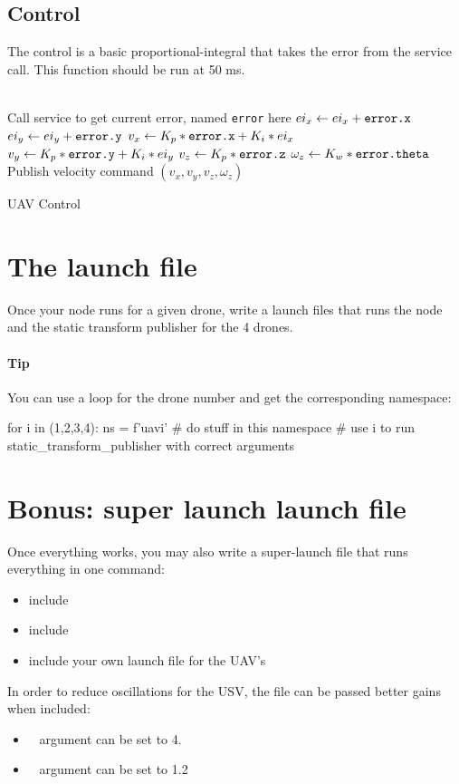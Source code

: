 \documentclass{ecnreport}
\begin{document}
\subsection{Control}

\newcommand{\var}[1]{\texttt{\upshape #1}}

The control is a basic proportional-integral that takes the error from the service call.
This function should be run at 50 ms.

 \begin{algorithm}[!h]
 \DontPrintSemicolon
 \;
 \Fill{}
 {
 \\
 Call service to get current error, named \var{error} here\;
 $ei_x \gets ei_x + \var{error.x}$ \;
 $ei_y \gets ei_y + \var{error.y}$ \;
 $v_x \gets K_p*\var{error.x} + K_i*ei_x$ \;
 $v_y \gets K_p*\var{error.y} + K_i*ei_y$ \;
 $v_z \gets K_p*\var{error.z}$ \;
 $\omega_z \gets K_w*\var{error.theta}$ \;
 Publish velocity command $(v_x,v_y,v_z,\omega_z)$\;
}
\caption{UAV Control}
\label{backtracking}
\end{algorithm}

\newpage
\section{The launch file}

Once your node runs for a given drone, write a launch files that runs the node and the static transform publisher for the 4 drones.

\paragraph{Tip} You can use a loop for the drone number and get the corresponding namespace:
\begin{pythoncode}
    for i in (1,2,3,4):
        ns = f'uav{i}'
        # do stuff in this namespace
        # use i to run static_transform_publisher with correct arguments
\end{pythoncode}

\section{Bonus: super launch launch file}

Once everything works, you may also write a super-launch file that runs everything in one command:
\begin{itemize}
 \item include 
 \item include 
 \item include your own launch file for the UAV's
\end{itemize}

In order to reduce oscillations for the USV, the  file can be passed better gains when included:
\begin{itemize}
 \item ~ argument can be set to 4.
 \item ~ argument can be set to 1.2
\end{itemize}
\end{document}
